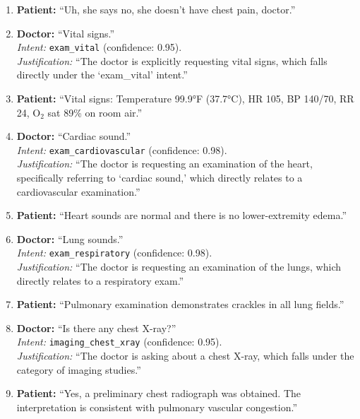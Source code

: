 \begin{enumerate}
  \item \textbf{Patient:} ``Uh, she says no, she doesn't have chest pain, doctor.''

  \item \textbf{Doctor:} ``Vital signs.'' \\
  \emph{Intent:} \texttt{exam\_vital} (confidence: 0.95). \\
  \emph{Justification:} ``The doctor is explicitly requesting vital signs, which falls directly under the `exam\_vital' intent.''

  \item \textbf{Patient:} ``Vital signs: Temperature 99.9°F (37.7°C), HR 105, BP 140/70, RR 24, O$_2$ sat 89\% on room air.''

  \item \textbf{Doctor:} ``Cardiac sound.'' \\
  \emph{Intent:} \texttt{exam\_cardiovascular} (confidence: 0.98). \\
  \emph{Justification:} ``The doctor is requesting an examination of the heart, specifically referring to `cardiac sound,' which directly relates to a cardiovascular examination.''

  \item \textbf{Patient:} ``Heart sounds are normal and there is no lower-extremity edema.''

  \item \textbf{Doctor:} ``Lung sounds.'' \\
  \emph{Intent:} \texttt{exam\_respiratory} (confidence: 0.98). \\
  \emph{Justification:} ``The doctor is requesting an examination of the lungs, which directly relates to a respiratory exam.''

  \item \textbf{Patient:} ``Pulmonary examination demonstrates crackles in all lung fields.''

  \item \textbf{Doctor:} ``Is there any chest X-ray?'' \\
  \emph{Intent:} \texttt{imaging\_chest\_xray} (confidence: 0.95). \\
  \emph{Justification:} ``The doctor is asking about a chest X-ray, which falls under the category of imaging studies.''

  \item \textbf{Patient:} ``Yes, a preliminary chest radiograph was obtained. The interpretation is consistent with pulmonary vascular congestion.''


\end{enumerate}
